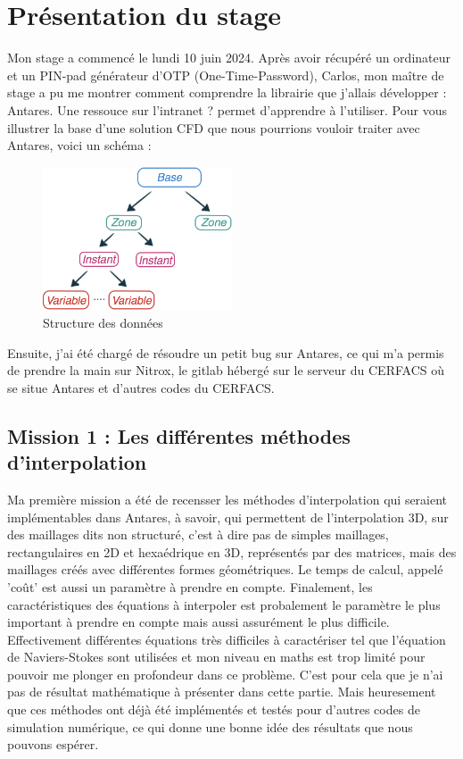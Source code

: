 \chapter{Présentation du stage}

Mon stage a commencé le lundi 10 juin 2024. Après avoir récupéré un ordinateur et un PIN-pad générateur d'OTP (One-Time-Password), Carlos, mon maître de stage a pu me montrer comment comprendre la librairie que j'allais développer : Antares. Une ressouce sur l'intranet ? permet d'apprendre à l'utiliser. Pour vous illustrer la base d'une solution CFD que nous pourrions vouloir traiter avec Antares, voici un schéma :

\begin{figure}[h!]
    \centering
    \includegraphics[width=0.5\textwidth]{images/data_structure_1.png}
    \caption{Structure des données} %
    \label{fig:https://cerfacs.fr/antares/src/tutorial/base.html}
\end{figure}


Ensuite, j'ai été chargé de résoudre un petit bug sur Antares, ce qui m'a permis de prendre la main sur Nitrox, le gitlab hébergé sur le serveur du CERFACS où se situe Antares et d'autres codes du CERFACS.

\section{Mission 1 : Les différentes méthodes d'interpolation}
Ma première mission a été de recensser les méthodes d'interpolation qui seraient implémentables dans Antares, à savoir, qui permettent de l'interpolation 3D, sur des maillages dits non structuré, c'est à dire pas de simples maillages, rectangulaires en 2D et hexaédrique en 3D, représentés par des matrices, mais des maillages créés avec différentes formes géométriques.
Le temps de calcul, appelé 'coût' est aussi un paramètre à prendre en compte.
Finalement, les caractéristiques des équations à interpoler est probalement le paramètre le plus important à prendre en compte mais aussi assurément le plus difficile. Effectivement différentes équations très difficiles à caractériser tel que l'équation de Naviers-Stokes sont utilisées et mon niveau en maths est trop limité pour pouvoir me plonger en profondeur dans ce problème. C'est pour cela que je n'ai pas de résultat mathématique à présenter dans cette partie. Mais heuresement que ces méthodes ont déjà été implémentés et testés pour d'autres codes de simulation numérique, ce qui donne une bonne idée des résultats que nous pouvons espérer.

